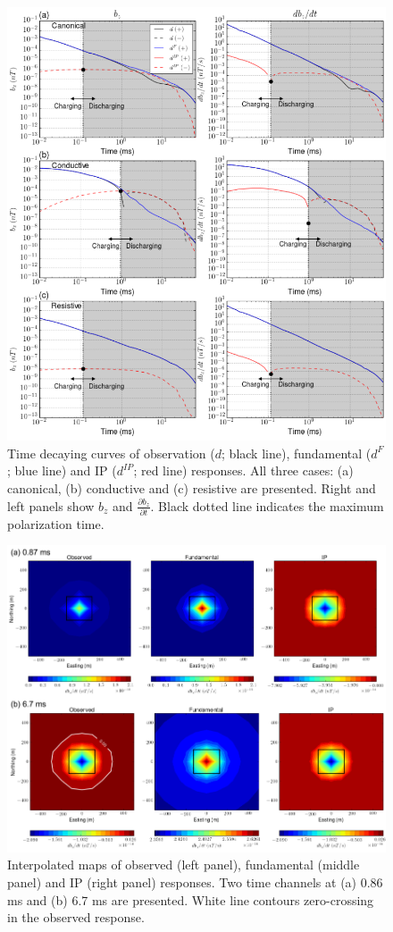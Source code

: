\documentclass[a4paper, 11pt]{article}
\newcommand{\dip}{d^{IP}}
\begin{document}
\begin{figure}[htb]
  \centering
  \includegraphics[width=1.\textwidth]{figures/Three_IPresp.png}
  \caption{Time decaying curves of observation ($d$; black line), fundamental ($d^F$; blue line) and IP ($\dip$; red line) responses. All three cases: (a) canonical, (b) conductive and (c) resistive are presented. Right and left panels show $b_z$ and $\frac{\partial b_z}{\partial t}$. Black dotted line indicates the maximum polarization time.}
  \label{F:Three_IPresp}
\end{figure}
\begin{figure}[htb]
  \centering
  \includegraphics[width=1.\textwidth]{figures/IPresp_Plan.png}
  \caption{Interpolated maps of observed (left panel), fundamental (middle panel) and IP (right panel) responses. Two time channels at (a) 0.86 ms and (b) 6.7 ms are presented. White line contours zero-crossing in the observed response.  
  }
  \label{F:IPresp_Plan}
\end{figure}
\end{document}
